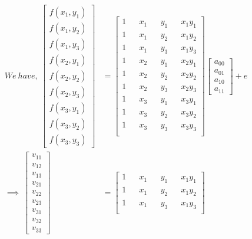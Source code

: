 \documentclass[a4paper,fleqn,11pt]{article}
\theoremstyle{mytheor}
\begin{document}
\begin{align}
We\ have,\ \begin{bmatrix}
				f(x_1, y_1) \\
				f(x_1, y_2) \\
				f(x_1, y_3) \\
				f(x_2, y_1) \\
				f(x_2, y_2) \\
				f(x_2, y_3) \\
				f(x_3, y_1) \\
				f(x_3, y_2) \\
				f(x_3, y_3)
			\end{bmatrix} & = 
			\begin{bmatrix}
				1 && x_1 &&	y_1 && x_1y_1 \\
				1 && x_1 &&	y_2 && x_1y_2 \\
				1 && x_1 &&	y_3 && x_1y_3 \\
				1 && x_2 &&	y_1 && x_2y_1 \\
				1 && x_2 &&	y_2 && x_2y_2 \\
				1 && x_2 &&	y_3 && x_2y_3 \\
				1 && x_3 &&	y_1 && x_3y_1 \\
				1 && x_3 &&	y_2 && x_3y_2 \\
				1 && x_3 &&	y_3 && x_3y_3 \\
			\end{bmatrix}
			\begin{bmatrix}
				a_{00} \\
				a_{01} \\
				a_{10} \\
				a_{11}	
			\end{bmatrix} + e \\
\implies\ \begin{bmatrix}
				v_{11} \\
				v_{12} \\
				v_{13} \\
				v_{21} \\
				v_{22} \\
				v_{23} \\
				v_{31} \\
				v_{32} \\
				v_{33}
			\end{bmatrix} & = 
			\begin{bmatrix}
				1 && x_1 &&	y_1 && x_1y_1 \\
				1 && x_1 &&	y_2 && x_1y_2 \\
				1 && x_1 &&	y_3 && x_1y_3 \\

\end{bmatrix}
\end{align}
\end{document}
